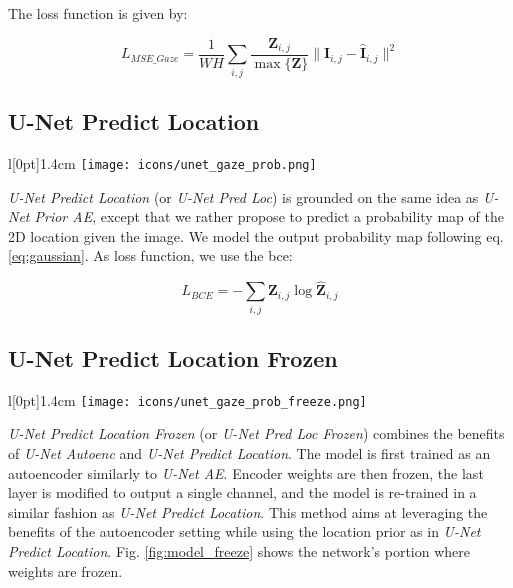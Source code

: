 The loss function is given by:

\begin{equation}
L_{MSE\_Gaze} = \frac{1}{W H} \sum_{i,j} \frac{\boldsymbol{Z}_{i,j}}{\max{\{\boldsymbol{Z}\}}} \|\boldsymbol{I}_{i,j} - \boldsymbol{\hat{I}}_{i,j}\|^2
\label{eq:mse_gaze_loss}
\end{equation}
\hspace{6pt}


\subsection{U-Net Predict Location} \label{sec:unet_pred_loc}

\begin{wrapfigure}[4]{l}[0pt]{1.4cm}
\texttt{[image: icons/unet\_gaze\_prob.png]}
\end{wrapfigure}

\textit{U-Net Predict Location} (or \textit{U-Net Pred Loc}) is grounded on the same idea as \textit{U-Net Prior AE}, except that we rather propose to predict a probability map of the 2D location given the image.
We model the output probability map following eq. \ref{eq:gaussian}.
As loss function, we use the \gls{bce}:

\begin{equation}
L_{BCE} = -\sum_{i,j} \boldsymbol{Z}_{i,j} \log{\boldsymbol{\hat{Z}}_{i,j}}
\label{eq:ce_loss}
\end{equation}
\hspace{6pt}

\clearpage
\subsection{U-Net Predict Location Frozen}

\setlength\intextsep{0pt}
\begin{wrapfigure}[4]{l}[0pt]{1.4cm}
\texttt{[image: icons/unet\_gaze\_prob\_freeze.png]}
\end{wrapfigure}

\textit{U-Net Predict Location Frozen} (or \textit{U-Net Pred Loc Frozen}) combines the benefits of \textit{U-Net Autoenc} and \textit{U-Net Predict Location}.
The model is first trained as an autoencoder similarly to \textit{U-Net AE}.
Encoder weights are then frozen, the last layer is modified to output a single channel, and the model is re-trained in a similar fashion as \textit{U-Net Predict Location}.
This method aims at leveraging the benefits of the autoencoder setting while using the location prior as in \textit{U-Net Predict Location}.
Fig. \ref{fig:model_freeze} shows the network's portion where weights are frozen.

